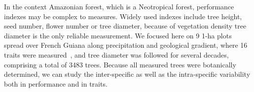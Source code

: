 In the context Amazonian forest, which is a Neotropical forest, performance indexes may be complex to measures. Widely used indexes include tree height, seed number, flower number or tree diameter, because of vegetation density tree diameter is the only reliable measurement. We focused here on 9 1-ha plots \missfig spread over French Guiana along precipitation and geological gradient, where 16 traits were measured~\citep{baraloto_decoupled_2010}, and tree diameter was followed for several decades, comprising a total of 3483 trees. Because all measured trees were botanically determined, we can study the inter-specific as well as the intra-specific variability both in performance and in traits.